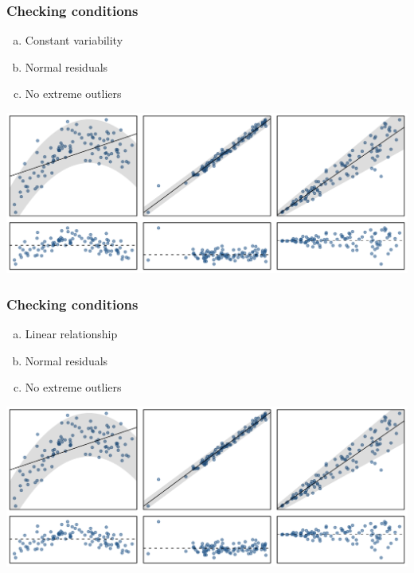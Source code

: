 
\begin{frame}
\frametitle{Checking conditions}

{
\begin{enumerate}[(a)]
\item Constant variability
\item Normal residuals
\item No extreme outliers
\end{enumerate}
}
{
\begin{center}
\includegraphics[width=\textwidth]{7-2_least_square_reg/figures/problems/nonlinear}
\end{center}
}

\end{frame}


\begin{frame}
\frametitle{Checking conditions}

{
\begin{enumerate}[(a)]
\item Linear relationship
\item Normal residuals
\item No extreme outliers
\end{enumerate}
}
{
\begin{center}
\includegraphics[width=\textwidth]{7-2_least_square_reg/figures/problems/heteroscedastic}
\end{center}
}

\end{frame}

